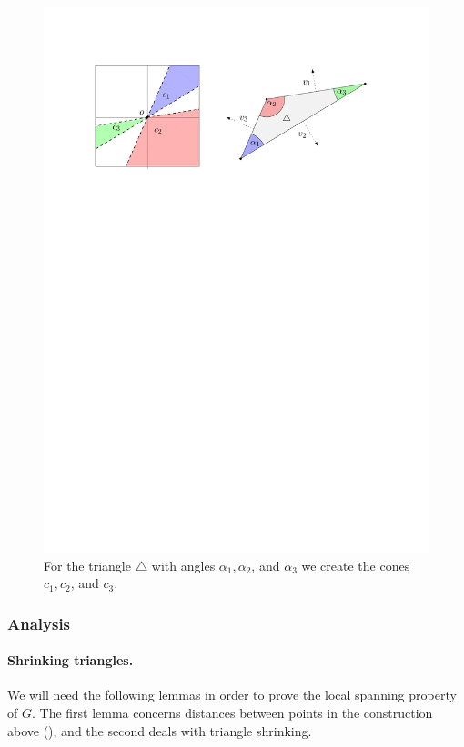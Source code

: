 \documentclass[12pt]{article}%
\begin{document}
\begin{figure}[h]
    \centering \includegraphics{figs/triangle_cones}
    \caption{For the triangle $\triangle$ with angles
       $\alpha_1,\alpha_2$, and $\alpha_3$ we create the cones
       $c_1,c_2$, and $c_3$.}
\end{figure}
\subsubsection{Analysis}


\paragraph{Shrinking triangles.}
We will need the following lemmas in order to prove the local spanning
property of $G$. The first lemma concerns distances between points in
the construction above (), and the second
deals with triangle shrinking.
\end{document}
